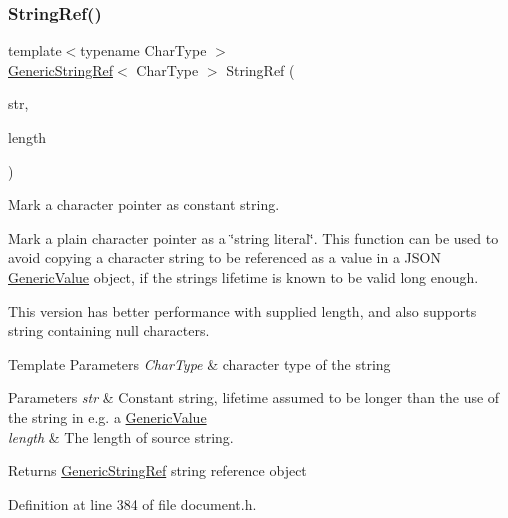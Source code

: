 \subsubsection{\texorpdfstring{StringRef()}{StringRef()}\hspace{0.1cm}{\footnotesize\ttfamily [2/2]}}
{\footnotesize\ttfamily template$<$typename Char\+Type $>$ \\
\mbox{\hyperlink{structrapidjson_1_1_generic_string_ref}{Generic\+String\+Ref}}$<$ Char\+Type $>$ String\+Ref (\begin{DoxyParamCaption}\item[{const Char\+Type $\ast$}]{str,  }\item[{size\+\_\+t}]{length }\end{DoxyParamCaption})\hspace{0.3cm}{\ttfamily [related]}}



Mark a character pointer as constant string. 

Mark a plain character pointer as a \char`\"{}string literal\char`\"{}. This function can be used to avoid copying a character string to be referenced as a value in a J\+S\+ON \mbox{\hyperlink{classrapidjson_1_1_generic_value}{Generic\+Value}} object, if the string\textquotesingle{}s lifetime is known to be valid long enough.

This version has better performance with supplied length, and also supports string containing null characters.


\begin{DoxyTemplParams}{Template Parameters}
{\em Char\+Type} & character type of the string \\
\hline
\end{DoxyTemplParams}

\begin{DoxyParams}{Parameters}
{\em str} & Constant string, lifetime assumed to be longer than the use of the string in e.\+g. a \mbox{\hyperlink{classrapidjson_1_1_generic_value}{Generic\+Value}} \\
\hline
{\em length} & The length of source string. \\
\hline
\end{DoxyParams}
\begin{DoxyReturn}{Returns}
\mbox{\hyperlink{structrapidjson_1_1_generic_string_ref}{Generic\+String\+Ref}} string reference object 
\end{DoxyReturn}


Definition at line 384 of file document.\+h.


